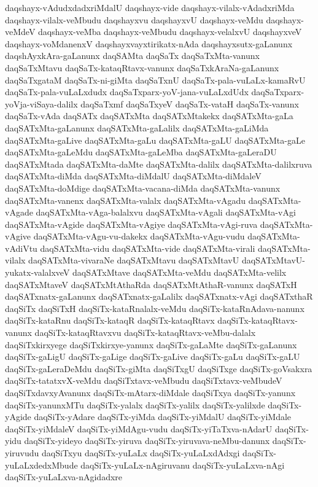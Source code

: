 {daqshayx-vAdudxdadxriMdalU
daqshayx-vide
daqshayx-vilalx-vAdadxriMda
daqshayx-vilalx-veMbudu
daqshayxvu
daqshayxvU
daqshayx-veMdu
daqshayx-veMdeV
daqshayx-veMba
daqshayx-veMbudu
daqshayx-velalxvU
daqshayxveV
daqshayx-voMdanenxV
daqshayxvayxtirikatx-nAda
daqshayxsutx-gaLanunx
daqshAyxkAra-gaLanunx
daqSAMta
daqSaTx
daqSaTxMta-vanunx
daqSaTxMtavu
daqSaTx-kataqRtavx-vanunx
daqSaTxkAraNa-gaLanunx
daqSaTxgataM
daqSaTx-ni-giMta
daqSaTxnU
daqSaTx-pala-vuLaLx-kamaRvU
daqSaTx-pala-vuLaLxdudx
daqSaTxparx-yoV-jana-vuLaLxdUdx
daqSaTxparx-yoVja-viSaya-dalilx
daqSaTxmf
daqSaTxyeV
daqSaTx-vataH
daqSaTx-vanunx
daqSaTx-vAda
daqSATx
daqSATxMta
daqSATxMtakekx
daqSATxMta-gaLa
daqSATxMta-gaLanunx
daqSATxMta-gaLalilx
daqSATxMta-gaLiMda
daqSATxMta-gaLive
daqSATxMta-gaLu
daqSATxMta-gaLU
daqSATxMta-gaLe
daqSATxMta-gaLeMdu
daqSATxMta-gaLeMba
daqSATxMta-gaLeraDU
daqSATxMtada
daqSATxMta-daMte
daqSATxMta-dalilx
daqSATxMta-dalilxruva
daqSATxMta-diMda
daqSATxMta-diMdalU
daqSATxMta-diMdaleV
daqSATxMta-doMdige
daqSATxMta-vacana-diMda
daqSATxMta-vanunx
daqSATxMta-vanenx
daqSATxMta-valalx
daqSATxMta-vAgadu
daqSATxMta-vAgade
daqSATxMta-vAga-balalxvu
daqSATxMta-vAgali
daqSATxMta-vAgi
daqSATxMta-vAgide
daqSATxMta-vAgiye
daqSATxMta-vAgi-ruva
daqSATxMta-vAgive
daqSATxMta-vAgu-vu-dakekx
daqSATxMta-vAgu-vudu
daqSATxMta-vAdiVtu
daqSATxMta-vidu
daqSATxMta-vide
daqSATxMta-virali
daqSATxMta-vilalx
daqSATxMta-vivaraNe
daqSATxMtavu
daqSATxMtavU
daqSATxMtavU-yukatx-valalxveV
daqSATxMtave
daqSATxMta-veMdu
daqSATxMta-velilx
daqSATxMtaveV
daqSATxMtAthaRda
daqSATxMtAthaR-vanunx
daqSATxH
daqSATxnatx-gaLanunx
daqSATxnatx-gaLalilx
daqSATxnatx-vAgi
daqSATxthaR
daqSiTx
daqSiTxH
daqSiTx-kataRnalalx-veMdu
daqSiTx-kataRnAdava-nanunx
daqSiTx-kataRnu
daqSiTx-kataqR
daqSiTx-kataqRtavx
daqSiTx-kataqRtavx-vanunx
daqSiTx-kataqRtavxvu
daqSiTx-kataqRtavx-veMbu-dalalx
daqSiTxkirxyege
daqSiTxkirxye-yanunx
daqSiTx-gaLaMte
daqSiTx-gaLanunx
daqSiTx-gaLigU
daqSiTx-gaLige
daqSiTx-gaLive
daqSiTx-gaLu
daqSiTx-gaLU
daqSiTx-gaLeraDeMdu
daqSiTx-giMta
daqSiTxgU
daqSiTxge
daqSiTx-goVsakxra
daqSiTx-tatatxvX-veMdu
daqSiTxtavx-veMbudu
daqSiTxtavx-veMbudeV
daqSiTxdavxyAvanunx
daqSiTx-mAtarx-diMdale
daqSiTxya
daqSiTx-yanunx
daqSiTx-yanunxMTu
daqSiTx-yalalx
daqSiTx-yalilx
daqSiTx-yalilxde
daqSiTx-yAgide
daqSiTx-yAdare
daqSiTx-yiMda
daqSiTx-yiMdalU
daqSiTx-yiMdale
daqSiTx-yiMdaleV
daqSiTx-yiMdAgu-vudu
daqSiTx-yiTaTxva-nAdarU
daqSiTx-yidu
daqSiTx-yideyo
daqSiTx-yiruva
daqSiTx-yiruvava-neMbu-danunx
daqSiTx-yiruvudu
daqSiTxyu
daqSiTx-yuLaLx
daqSiTx-yuLaLxdAdxgi
daqSiTx-yuLaLxdedxMbude
daqSiTx-yuLaLx-nAgiruvanu
daqSiTx-yuLaLxva-nAgi
daqSiTx-yuLaLxva-nAgidadxre
}
